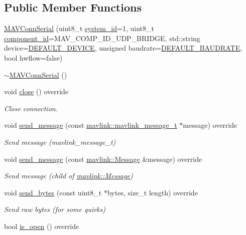 \subsection*{Public Member Functions}
\begin{DoxyCompactItemize}
\item 
\mbox{\hyperlink{group__mavconn_ga53b8b8d9fceab4d4a2767b3aa0a25462}{M\+A\+V\+Conn\+Serial}} (uint8\+\_\+t \mbox{\hyperlink{setHome_8cpp_a83150acb88d810ae6864b4c125324ed6}{system\+\_\+id}}=1, uint8\+\_\+t \mbox{\hyperlink{setHome_8cpp_adc84285d5da2c4fa9721d0a32d5e41a7}{component\+\_\+id}}=M\+A\+V\+\_\+\+C\+O\+M\+P\+\_\+\+I\+D\+\_\+\+U\+D\+P\+\_\+\+B\+R\+I\+D\+GE, std\+::string device=\mbox{\hyperlink{group__mavconn_ga3b2c35e0bfa1020060b2fde345d66f0e}{D\+E\+F\+A\+U\+L\+T\+\_\+\+D\+E\+V\+I\+CE}}, unsigned baudrate=\mbox{\hyperlink{group__mavconn_gaf0dd28c4a6b236f2ec3092a1b35ff5df}{D\+E\+F\+A\+U\+L\+T\+\_\+\+B\+A\+U\+D\+R\+A\+TE}}, bool hwflow=false)
\item 
\mbox{\hyperlink{group__mavconn_ga63860bdb6f3eb8a5ef266fc99edd715d}{$\sim$\+M\+A\+V\+Conn\+Serial}} ()
\item 
void \mbox{\hyperlink{group__mavconn_gabacc69adc5d2d2f9cb3aa27907d83d5c}{close}} () override
\begin{DoxyCompactList}\small\item\em Close connection. \end{DoxyCompactList}\item 
void \mbox{\hyperlink{group__mavconn_ga452a97c9cd256b591eee063a1927a93a}{send\+\_\+message}} (const \mbox{\hyperlink{include__v0_89_2mavlink__types_8h_a63b963764c09dc72f4910c1521e325b9}{mavlink\+::mavlink\+\_\+message\+\_\+t}} $\ast$message) override
\begin{DoxyCompactList}\small\item\em Send message (mavlink\+\_\+message\+\_\+t) \end{DoxyCompactList}\item 
void \mbox{\hyperlink{group__mavconn_ga7e251c28c05beb0becbe571f5f39c3bb}{send\+\_\+message}} (const \mbox{\hyperlink{structmavlink_1_1Message}{mavlink\+::\+Message}} \&message) override
\begin{DoxyCompactList}\small\item\em Send message (child of \mbox{\hyperlink{structmavlink_1_1Message}{mavlink\+::\+Message}}) \end{DoxyCompactList}\item 
void \mbox{\hyperlink{group__mavconn_ga6073d6f88157f3b29ee519eafe16f8fd}{send\+\_\+bytes}} (const uint8\+\_\+t $\ast$bytes, size\+\_\+t length) override
\begin{DoxyCompactList}\small\item\em Send raw bytes (for some quirks) \end{DoxyCompactList}\item 
bool \mbox{\hyperlink{group__mavconn_ga7b2ae62cddd41671b3312050f64b3036}{is\+\_\+open}} () override
\end{DoxyCompactItemize}
